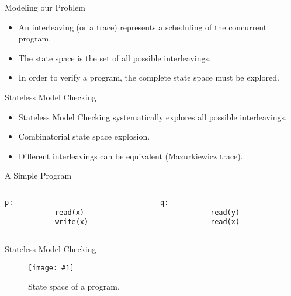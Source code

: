 \documentclass[9pt]{beamer}
\newcommand{\tracelong}[2]{
\begin{figure}[H]
\centering
\texttt{[image: \#1]}
\caption{#2}
\label{#2}
\end{figure}
}
\begin{document}
\begin{frame}[fragile]{Modeling our Problem}

\begin{itemize}[<+->]
    \item An interleaving (or a trace) represents a scheduling of the concurrent program.
    \item The state space is the set of all possible interleavings.
    \item In order to verify a program, the complete state space must be explored.
\end{itemize}

\end{frame}

\begin{frame}{Stateless Model Checking}

\begin{itemize}[<+->]
    \item Stateless Model Checking systematically explores all possible interleavings.
    \item Combinatorial state space explosion.
    \item Different interleavings can be equivalent (Mazurkiewicz trace).
\end{itemize}

\end{frame}

\begin{frame}[fragile]{A Simple Program}


\begin{columns}[onlytextwidth]
    \begin{column}{0.4\textwidth}
        \begin{lstlisting}[frame=none, numbers=none]
            p:
            read(x)
            write(x)
        \end{lstlisting}
    \end{column}
    \begin{column}{0.4\textwidth}
        \begin{lstlisting}[frame=none, numbers=none]
            q:
            read(y)
            read(x)
        \end{lstlisting}
    \end{column}
\end{columns}


\end{frame}



\begin{frame} {Stateless Model Checking}


\tracelong{../img/initstateless.png}{State space of a program.}

\end{frame}
\end{document}
